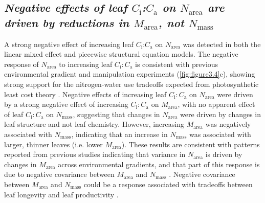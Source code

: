 \begin{singlespace}
\subsection{\textit{Negative effects of leaf $C_\mathrm{i}$:$C_\mathrm{a}$ on $N_\mathrm{area}$ are driven by reductions in $M_\mathrm{area}$, not $N_\mathrm{mass}$}}
\end{singlespace}
\noindent A strong negative effect of increasing leaf $C_\mathrm{i}$:$C_\mathrm{a}$ on $N_\mathrm{area}$ was detected in both the linear mixed effect and piecewise structural equation models. The negative response of $N_\mathrm{area}$ to increasing leaf $C_\mathrm{i}\mathrm{:}C_\mathrm{a}$ is consistent with previous environmental gradient  and manipulation experiments (\ref{fig:figure3.4}c), showing strong support for the nitrogen-water use tradeoffs expected from photosynthetic least cost theory . Negative effects of increasing leaf $C_\mathrm{i}\mathrm{:}C_\mathrm{a}$ on $N_\mathrm{area}$ were driven by a strong negative effect of increasing $C_\mathrm{i}\mathrm{:}C_\mathrm{a}$ on $M_\mathrm{area}$, with no apparent effect of leaf $C_\mathrm{i}\mathrm{:}C_\mathrm{a}$ on $N_\mathrm{mass}$, suggesting that changes in $N_\mathrm{area}$ were driven by changes in leaf structure and not leaf chemistry. However, increasing $M_\mathrm{area}$ was negatively associated with $N_\mathrm{mass}$, indicating that an increase in $N_\mathrm{mass}$ was associated with larger, thinner leaves (i.e. lower $M_\mathrm{area}$). These results are consistent with patterns reported from previous studies indicating that variance in $N_\mathrm{area}$ is driven by changes in $M_\mathrm{area}$ across environmental gradients, and that part of this response is due to negative covariance between $M_\mathrm{area}$ and $N_\mathrm{mass}$ . Negative covariance between $M_\mathrm{area}$ and $N_\mathrm{mass}$ could be a response associated with tradeoffs between leaf longevity and leaf productivity .

